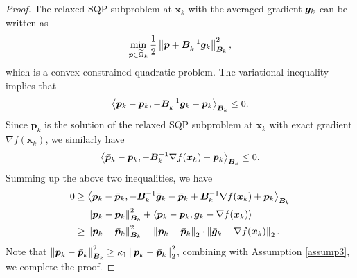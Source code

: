 \documentclass[aos]{imsart}
\numberwithin{equation}{section}
\theoremstyle{plain}
\begin{document}
\begin{appendix}
\begin{proof}
    The relaxed SQP subproblem at $\bm{x}_k$ with the averaged gradient $\Bar{\bm{g}}_{k}$ can be written as 
    \begin{equation*}
        \min_{\bm{p} \in \widetilde{\Omega}_k} \frac{1}{2}\left\| \bm{p} + \bm{B}_k^{-1} \Bar{\bm{g}}_{k} \right\|_{\bm{B}_k}^2,
    \end{equation*}
    which is a convex-constrained quadratic problem. The variational inequality implies that 
    \begin{equation*}
        \left \langle \bm{p}_k - \Bar{\bm{p}}_k, - \bm{B}_k^{-1} \Bar{\bm{g}}_{k} - \Bar{\bm{p}}_k \right \rangle_{\bm{B}_k} \leq 0.
    \end{equation*}
    Since $\bm{p}_k$ is the solution of the relaxed SQP subproblem at $\bm{x}_k$ with exact gradient $\nabla f(\bm{x}_k)$, we similarly have 
    \begin{equation*}
        \left \langle  \Bar{\bm{p}}_k - \bm{p}_k, - \bm{B}_k^{-1} \nabla f(\bm{x}_k) - \bm{p}_k \right \rangle_{\bm{B}_k} \leq 0.
    \end{equation*}
    Summing up the above two inequalities, we have 
    \begin{equation}
    \begin{split}
        0 & \geq \left \langle \bm{p}_k - \Bar{\bm{p}}_k, - \bm{B}_k^{-1} \Bar{\bm{g}}_{k} - \Bar{\bm{p}}_k + \bm{B}_k^{-1} \nabla f(\bm{x}_k) + \bm{p}_k\right \rangle_{\bm{B}_k} \\
        & = \left \|  \bm{p}_k - \Bar{\bm{p}}_k \right \|_{\bm{B}_k}^2 + \left \langle  \Bar{\bm{p}}_k - \bm{p}_k, \Bar{\bm{g}}_{k} - \nabla f(\bm{x}_k)  \right \rangle\\
        & \geq \left \|  \bm{p}_k - \Bar{\bm{p}}_k \right \|_{\bm{B}_k}^2 - \left\|  \bm{p}_k - \Bar{\bm{p}}_k\right\|_2 \cdot \left\| \Bar{\bm{g}}_{k} - \nabla f(\bm{x}_k) \right\|_2.
    \end{split}
    \end{equation}
    Note that $\left \|  \bm{p}_k - \Bar{\bm{p}}_k \right \|_{\bm{B}_k}^2 \geq \kappa_1 \left \|  \bm{p}_k - \Bar{\bm{p}}_k \right \|_2^2$, combining with Assumption \ref{assump3}, we complete the proof. 
\end{proof}



\end{appendix}
\end{document}
